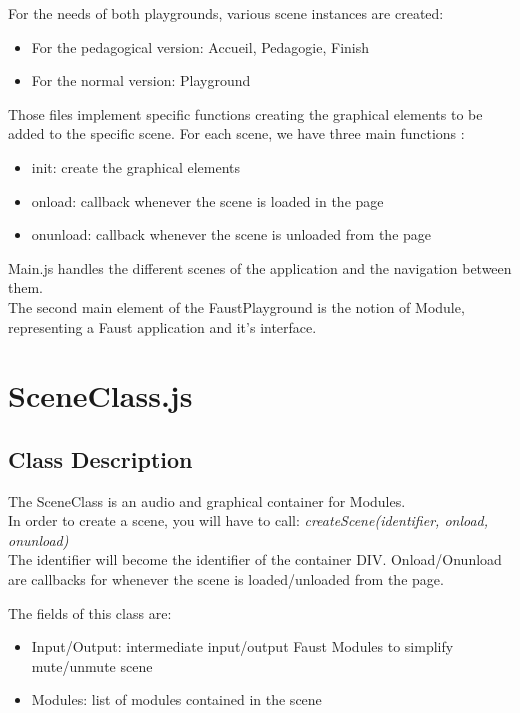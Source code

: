 \documentclass[a4paper]{article}
\begin{document}
For the needs of both playgrounds, various scene instances are created:
\begin{itemize} 
\item For the pedagogical version: Accueil, Pedagogie, Finish
\item For the normal version: Playground
\end{itemize}

Those files implement specific functions creating the graphical elements to be added to the specific scene.
For each scene, we have three main functions :
\begin{itemize}
\item init: create the graphical elements
\item onload: callback whenever the scene is loaded in the page
\item onunload: callback whenever the scene is unloaded from the page
\end{itemize}
 
 Main.js handles the different scenes of the application and the navigation between them. \\
 
 The second main element of the FaustPlayground is the notion of Module, representing a Faust application and it's interface.

\section{SceneClass.js}

\subsection{Class Description}
The SceneClass is an audio and graphical container for Modules. \\

In order to create a scene, you will have to call: {\it createScene(identifier, onload, onunload)}\\
The identifier will become the identifier of the container DIV. Onload/Onunload are callbacks for whenever the scene is loaded/unloaded from the page.

The fields of this class are:
\begin{itemize}
\item Input/Output: intermediate input/output Faust Modules to simplify mute/unmute scene
\item Modules: list of modules contained in the scene
\end{itemize}
\end{document}
